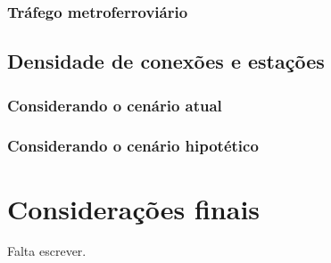 \documentclass[
article,			%
11pt,				%
oneside,			%
a4paper,			%
english,			%
brazil,				%
sumario=tradicional
]{abntex2}
\begin{document}
	\subsubsection{Tráfego metroferroviário} \label{s3:metrofuturo}
	
	\subsection{Densidade de conexões e estações} \label{s2:densidadeconexoes}
	
	\subsubsection{Considerando o cenário atual} \label{s3:densidadeatual}
	
	\subsubsection{Considerando o cenário hipotético} \label{s3:densidadefuturo}
	
	
	\section*{Considerações finais}
	
	Falta escrever.
	
	\postextual
	
	
	
	\renewcommand{\glossaryname}{Glossário}
	\renewcommand*{\glsseeformat}[3][\seename]{\textit{#1}
		\glsseelist{#2}}
	
\end{document}
